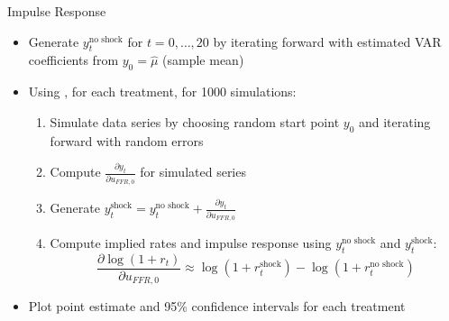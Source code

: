 \documentclass{beamer}
\begin{document}
\begin{frame}{Impulse Response}
\begin{itemize}
\item Generate $y_t^\text{no shock}$ for $t = 0, \ldots, 20$ by iterating forward with estimated VAR coefficients from $y_0 = \hat{\mu}$ (sample mean)
\item Using \cite{kilian98}, for each treatment, for 1000 simulations:
  \begin{enumerate}
  \item Simulate data series by choosing random start point $y_0$ and iterating forward with random errors
  \item Compute $\frac{\partial y_t}{\partial u_{FFR,0}}$ for simulated series
  \item Generate $y_t^\text{shock} = y_t^\text{no shock} + \frac{\partial y_t}{\partial u_{FFR,0}}$
  \item Compute implied rates and impulse response using $y_t^\text{no shock}$ and $y_t^\text{shock}$: $$\frac{\partial \log(1+r_t)}{\partial u_{FFR,0}} \approx \log(1 + r_t^\text{shock}) - \log(1 + r_t^\text{no shock})$$
  \end{enumerate}
\item Plot point estimate and 95\% confidence intervals for each treatment
\end{itemize}
\end{frame}
\end{document}
